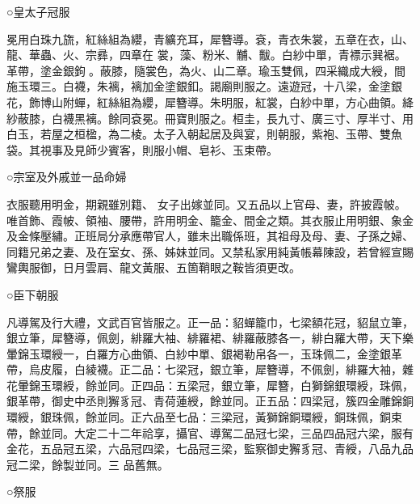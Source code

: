 \begin{pinyinscope}
 ○皇太子冠服



 冕用白珠九旒，紅絲組為纓，青纊充耳，犀簪導。袞，青衣朱裳，五章在衣，山、龍、華蟲、火、宗彞，四章在
 裳，藻、粉米、黼、黻。白紗中單，青褾示巽裾。革帶，塗金銀鉤。蔽膝，隨裳色，為火、山二章。瑜玉雙佩，四采織成大綬，間施玉環三。白襪，朱褵，褵加金塗銀釦。謁廟則服之。遠遊冠，十八梁，金塗銀花，飾博山附蟬，紅絲組為纓，犀簪導。朱明服，紅裳，白紗中單，方心曲領。絳紗蔽膝，白襪黑褵。餘同袞冕。冊寶則服之。桓圭，長九寸、廣三寸、厚半寸、用白玉，若屋之桓楹，為二棱。太子入朝起居及與宴，則朝服，紫袍、玉帶、雙魚袋。其視事及見師少賓客，則服小帽、皂衫、玉束帶。



 ○宗室及外戚並一品命婦



 衣服聽用明金，期親雖別籍、
 女子出嫁並同。又五品以上官母、妻，許披霞帔。唯首飾、霞帔、領袖、腰帶，許用明金、籠金、間金之類。其衣服止用明銀、象金及金條壓繡。正班局分承應帶官人，雖未出職係班，其祖母及母、妻、子孫之婦、同籍兄弟之妻、及在室女、孫、姊妹並同。又禁私家用純黃帳幕陳設，若曾經宣賜鸞輿服御，日月雲肩、龍文黃服、五箇鞘眼之鞍皆須更改。



 ○臣下朝服



 凡導駕及行大禮，文武百官皆服之。正一品：貂蟬籠巾，七梁額花冠，貂鼠立筆，銀立筆，犀簪導，佩劍，緋羅大袖、緋羅裙、緋羅蔽膝各一，緋白羅大帶，天下樂
 暈錦玉環綬一，白羅方心曲領、白紗中單、銀褐勒帛各一，玉珠佩二，金塗銀革帶，烏皮履，白綾襪。正二品：七梁冠，銀立筆，犀簪導，不佩劍，緋羅大袖，雜花暈錦玉環綬，餘並同。正四品：五梁冠，銀立筆，犀簪，白獅錦銀環綬，珠佩，銀革帶，御史中丞則獬豸冠、青荷蓮綬，餘並同。正五品：四梁冠，簇四金雕錦銅環綬，銀珠佩，餘並同。正六品至七品：三梁冠，黃獅錦銅環綬，銅珠佩，銅束帶，餘並同。大定二十二年祫享，攝官、導駕二品冠七梁，三品四品冠六梁，服有金花，五品冠五梁，六品冠四梁，七品冠三梁，監察御史獬豸冠、青綬，八品九品冠二梁，餘製並同。三
 品舊無。



 ○祭服




\end{pinyinscope}

